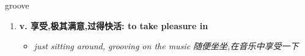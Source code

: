 
\begin{frame}
{\huge groove}
\begin{center}
\begin{enumerate}\Large
  \item \textbf{v. 享受,极其满意,过得快活: to take pleasure in}
  \begin{itemize}
    \item \em{\Large{just sitting around, grooving on the music 随便坐坐,在音乐中享受一下}}
  \end{itemize}
\end{enumerate}
\end{center}
\end{frame}
